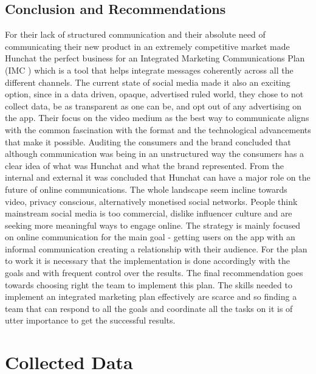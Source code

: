 \documentclass[12pt]{article}
\begin{document}
\subsection{Conclusion and Recommendations}
For their lack of structured communication and their absolute need of communicating their new product in an extremely competitive market made Hunchat the perfect business for an Integrated Marketing Communications Plan (IMC ) which is a tool that helps integrate messages coherently across all the different channels. The current state of social media made it also an exciting option, since in a data driven, opaque, advertised ruled world, they chose to not collect data, be as transparent as one can be, and opt out of any advertising on the app. Their focus on the video medium as the best way to communicate aligns with the common fascination with the format and the technological advancements that make it possible. Auditing the consumers and the brand concluded that although communication was being in an unstructured way the consumers has a clear idea of what was Hunchat and what the brand represented. 
From the internal and external it was concluded that Hunchat can have a major role on the future of online communications. The whole landscape seem incline towards video, privacy conscious, alternatively monetised social networks. People think mainstream social media is too commercial, dislike influencer culture and are seeking more meaningful ways to engage online.
The strategy is mainly focused on online communication for the main goal - getting users on the app with an informal communication creating a relationship with their audience. For the plan to work it is necessary that the implementation is done accordingly with the goals and with frequent control over the results.
The final recommendation goes towards choosing right the team to implement this plan. The skills needed to implement an integrated marketing plan effectively are scarce and so finding a team that can respond to all the goals and coordinate all the tasks on it is of utter importance to get the successful results.



\cleardoublepage
\newpage	

\printbibliography
\cleardoublepage

\appendix

\section{Collected Data}\label{data}
\end{document}
